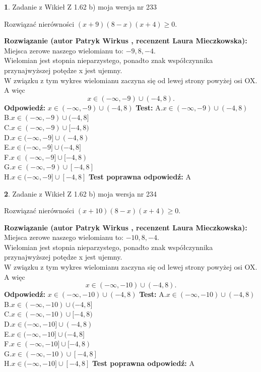 \documentclass[12pt, a4paper]{article}
\theoremstyle{definition} %
\newtheorem{zad}{}
\newcommand{\zadStart}[1]{\begin{zad}#1\newline}
\newcommand{\zadStop}{\end{zad}}
\newcommand{\rozwStart}[2]{\noindent \textbf{Rozwiązanie (autor #1 , recenzent #2): }\newline}
\newcommand{\rozwStop}{\newline}
\newcommand{\odpStart}{\noindent \textbf{Odpowiedź:}\newline}
\newcommand{\odpStop}{\newline}
\newcommand{\testStart}{\noindent \textbf{Test:}\newline}
\newcommand{\testStop}{\newline}
\newcommand{\kluczStart}{\noindent \textbf{Test poprawna odpowiedź:}\newline}
\newcommand{\kluczStop}{\newline}
\begin{document}
\zadStart{Zadanie z Wikieł Z 1.62 b) moja wersja nr 233}

Rozwiązać nierówności $(x+9)(8-x)(x+4)\ge0$.
\zadStop
\rozwStart{Patryk Wirkus}{Laura Mieczkowska}
Miejsca zerowe naszego wielomianu to: $-9, 8, -4$.\\
Wielomian jest stopnia nieparzystego, ponadto znak współczynnika przy\linebreak najwyższej potędze x jest ujemny.\\ W związku z tym wykres wielomianu zaczyna się od lewej strony powyżej osi OX. A więc $$x \in (-\infty,-9) \cup (-4,8).$$
\rozwStop
\odpStart
$x \in (-\infty,-9) \cup (-4,8)$
\odpStop
\testStart
A.$x \in (-\infty,-9) \cup (-4,8)$\\
B.$x \in (-\infty,-9) \cup (-4,8]$\\
C.$x \in (-\infty,-9) \cup [-4,8)$\\
D.$x \in (-\infty,-9] \cup (-4,8)$\\
E.$x \in (-\infty,-9] \cup (-4,8]$\\
F.$x \in (-\infty,-9] \cup [-4,8)$\\
G.$x \in (-\infty,-9) \cup [-4,8]$\\
H.$x \in (-\infty,-9] \cup [-4,8]$
\testStop
\kluczStart
A
\kluczStop



\zadStart{Zadanie z Wikieł Z 1.62 b) moja wersja nr 234}

Rozwiązać nierówności $(x+10)(8-x)(x+4)\ge0$.
\zadStop
\rozwStart{Patryk Wirkus}{Laura Mieczkowska}
Miejsca zerowe naszego wielomianu to: $-10, 8, -4$.\\
Wielomian jest stopnia nieparzystego, ponadto znak współczynnika przy\linebreak najwyższej potędze x jest ujemny.\\ W związku z tym wykres wielomianu zaczyna się od lewej strony powyżej osi OX. A więc $$x \in (-\infty,-10) \cup (-4,8).$$
\rozwStop
\odpStart
$x \in (-\infty,-10) \cup (-4,8)$
\odpStop
\testStart
A.$x \in (-\infty,-10) \cup (-4,8)$\\
B.$x \in (-\infty,-10) \cup (-4,8]$\\
C.$x \in (-\infty,-10) \cup [-4,8)$\\
D.$x \in (-\infty,-10] \cup (-4,8)$\\
E.$x \in (-\infty,-10] \cup (-4,8]$\\
F.$x \in (-\infty,-10] \cup [-4,8)$\\
G.$x \in (-\infty,-10) \cup [-4,8]$\\
H.$x \in (-\infty,-10] \cup [-4,8]$
\testStop
\kluczStart
A
\kluczStop
\end{document}
